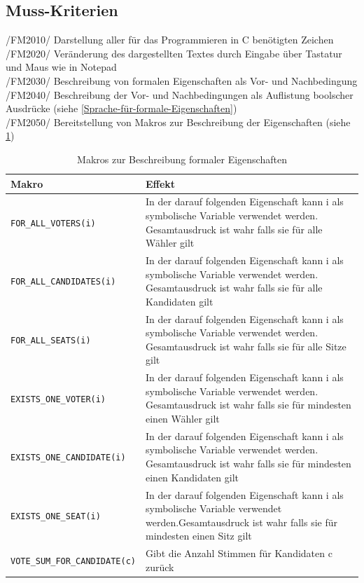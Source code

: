 \documentclass[a4paper]{scrreprt}
\begin{document}
\subsection{Muss-Kriterien}
/FM2010/ Darstellung aller für das Programmieren in C benötigten Zeichen \\
/FM2020/ Veränderung des dargestellten Textes durch Eingabe über Tastatur und Maus wie in Notepad \\
/FM2030/ Beschreibung von formalen Eigenschaften als Vor- und Nachbedingung  \\
/FM2040/ Beschreibung der Vor- und Nachbedingungen als Auflistung boolscher Ausdrücke (siehe \ref{Sprache-für-formale-Eigenschaften})\\
/FM2050/ Bereitstellung von Makros zur Beschreibung der Eigenschaften (siehe \ref{table:Macros_for_formal_Attributes}) \\

\begin{table}[H]
\caption{Makros zur Beschreibung formaler Eigenschaften}
\begin{tabular}{|p{5cm}|p{10cm}|}
\hline 
Makro & Effekt \\
\hline 
\verb!FOR_ALL_VOTERS(i)! & In der darauf folgenden Eigenschaft kann i als symbolische Variable verwendet werden. Gesamtausdruck ist wahr falls sie für alle Wähler gilt \\
\hline 
\verb!FOR_ALL_CANDIDATES(i)! & In der darauf folgenden Eigenschaft kann i als symbolische Variable verwendet werden. Gesamtausdruck ist wahr falls sie für alle Kandidaten gilt \\
\hline 
\verb!FOR_ALL_SEATS(i)! & In der darauf folgenden Eigenschaft kann i als symbolische Variable verwendet werden. Gesamtausdruck ist wahr falls sie für alle Sitze gilt \\
\hline 
\verb!EXISTS_ONE_VOTER(i)! & In der darauf folgenden Eigenschaft kann i als symbolische Variable verwendet werden. Gesamtausdruck ist wahr falls sie für mindesten einen Wähler gilt \\
\hline 
\verb!EXISTS_ONE_CANDIDATE(i)! & In der darauf folgenden Eigenschaft kann i als symbolische Variable verwendet werden. Gesamtausdruck ist wahr falls sie für mindesten einen Kandidaten gilt \\
\hline 
\verb!EXISTS_ONE_SEAT(i)! & In der darauf folgenden Eigenschaft kann i als symbolische Variable verwendet werden.Gesamtausdruck ist wahr falls sie für mindesten einen Sitz gilt \\
\hline 
\verb!VOTE_SUM_FOR_CANDIDATE(c)! & Gibt die Anzahl Stimmen für Kandidaten c zurück\\
\hline 
\end{tabular}
\label{table:Macros_for_formal_Attributes}
\end{table}
\end{document}
